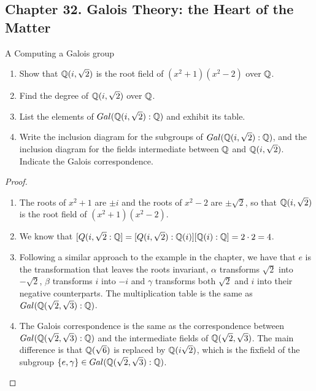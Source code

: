 \subsection*{Chapter 32. Galois Theory: the Heart of the Matter}


\begin{exercise}{A Computing a Galois group}
\begin{enumerate}
    \item Show that $\mathbb{Q}(i,\sqrt{2})$ is the root field of $(x^2+1)(x^2-2)$ over $\mathbb{Q}$.
    \item Find the degree of $\mathbb{Q}(i,\sqrt{2})$ over $\mathbb{Q}$.
    \item List the elements of $Gal(\mathbb{Q}(i,\sqrt{2}):\mathbb{Q})$ and exhibit its table.
    \item Write the inclusion diagram for the subgroups of $Gal(\mathbb{Q}(i,\sqrt{2}):\mathbb{Q})$, and the inclusion diagram for the fields intermediate between $\mathbb{Q}$ and $\mathbb{Q}(i,\sqrt{2})$. Indicate the Galois correspondence.
\end{enumerate}
\end{exercise}
\begin{proof}
 \begin{enumerate}
     \item The roots of $x^2+1$ are $\pm i$ and the roots of $x^2-2$ are $\pm\sqrt{2}$, so that $\mathbb{Q}(i,\sqrt{2})$ is the root field of $(x^2+1)(x^2-2)$.
     \item We know that $[Q(i,\sqrt{2}:\mathbb{Q}]=[Q(i,\sqrt{2}):\mathbb{Q}(i)][\mathbb{Q}(i):\mathbb{Q}]=2\cdot 2=4$.
     \item Following a similar approach to the example in the chapter, we have that $e$ is the transformation that leaves the roots invariant, $\alpha$ transforms $\sqrt{2}$ into $-\sqrt{2}$, $\beta$ transforms $i$ into $-i$ and $\gamma$ transforms both $\sqrt{2}$ and $i$ into their negative counterparts. The multiplication table is the same as $Gal(\mathbb{Q}(\sqrt{2},\sqrt{3}):\mathbb{Q})$.
     \item The Galois correspondence is the same as the correspondence between $Gal(\mathbb{Q}(\sqrt{2},\sqrt{3}):\mathbb{Q})$ and the intermediate fields of $\mathbb{Q}(\sqrt{2},\sqrt{3})$. The main difference is that $\mathbb{Q}(\sqrt{6})$ is replaced by $\mathbb{Q}(i\sqrt{2})$, which is the fixfield of the subgroup $\{e,\gamma\}\in Gal(\mathbb{Q}(\sqrt{2},\sqrt{3}):\mathbb{Q})$.
 \end{enumerate}
\end{proof}

